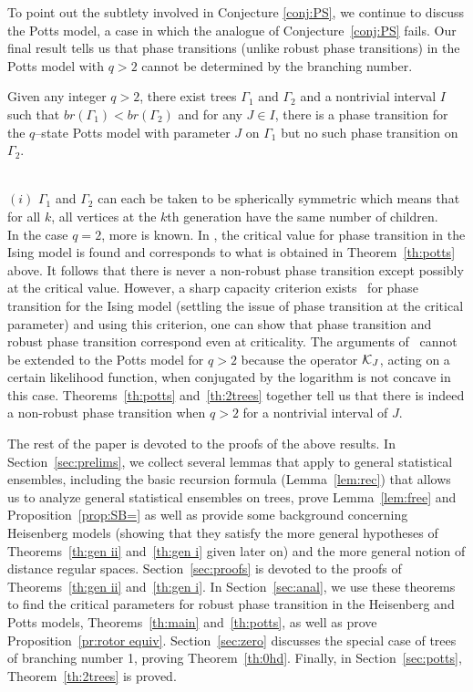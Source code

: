 To point out the subtlety involved in Conjecture \ref{conj:PS}, 
we continue to discuss the Potts model, a case in which the analogue of 
Conjecture~\ref{conj:PS} fails. Our final result tells us that 
phase transitions (unlike robust phase transitions) in the Potts model with
$q > 2$ cannot be determined by the branching number.

\begin{th} \label{th:2trees} Given any integer $q >2$,
there exist trees $\Gamma_1$ and $\Gamma_2$ and a nontrivial interval $I$ such
that $\textstyle {br} (\Gamma_1) < \textstyle {br} (\Gamma_2)$ 
and for any $J\in I$, there is a phase transition for the $q$--state
Potts model with parameter $J$ on $\Gamma_1$ but 
no such phase transition on $\Gamma_2$.
\end{th}

\newpage
{}\\
$(i)$ $\Gamma_1$ and $\Gamma_2$ can each be taken to
be spherically symmetric which means that for all $k$, all vertices at the
$k$th generation have the same number of children. \\
In the case $q=2$, more is known.  In \cite{Ly1}, the critical value
for phase transition in the Ising model is found and corresponds to
what is obtained in Theorem~\ref{th:potts} above. It follows that 
there is never
a non-robust phase transition except possibly at the critical value. However,
a sharp capacity criterion exists~\cite{PP} for phase transition for the
Ising model (settling the issue of phase transition at the critical parameter)
and using this criterion, one can show that phase transition and robust 
phase transition correspond even at criticality.
The arguments of~\cite{PP} cannot be extended to the Potts model for $q > 2$
because the operator ${\cal K}_J$, acting on a certain likelihood function,
when conjugated by the logarithm is not concave in this case.
Theorems~\ref{th:potts} and~\ref{th:2trees}
together tell us that there is indeed a non-robust phase
transition when $q > 2$ for a nontrivial interval of $J$.

The rest of the paper is devoted to the proofs of the above results.
In Section~\ref{sec:prelims}, we collect several lemmas that apply to
general statistical ensembles, including the basic recursion 
formula (Lemma~\ref{lem:rec}) that allows us to analyze general statistical 
ensembles on trees, prove Lemma~\ref{lem:free} and
Proposition~\ref{prop:SB=} as well as provide some background
concerning Heisenberg models (showing that they satisfy the more
general hypotheses of Theorems~\ref{th:gen ii} and~\ref{th:gen i} given
later on) and the more general notion of distance
regular spaces.  Section~\ref{sec:proofs} is devoted to the proofs of
Theorems~\ref{th:gen ii} and~\ref{th:gen i}.  In
Section~\ref{sec:anal}, we use these theorems to find the critical
parameters for robust phase transition in the Heisenberg and
Potts models, Theorems~\ref{th:main} and~\ref{th:potts}, as well as
prove Proposition~\ref{pr:rotor equiv}.
Section~\ref{sec:zero} discusses the special case of trees of
branching number 1, proving Theorem~\ref{th:0hd}. Finally, in
Section~\ref{sec:potts}, Theorem~\ref{th:2trees} is proved.

